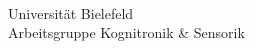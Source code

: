 


%


\thispagestyle{empty}



\begin{verbatim}


\end{verbatim}

\begin{center}
\Large{Universität Bielefeld}\\
\Large{Arbeitsgruppe Kognitronik \& Sensorik}\\
\end{center}


